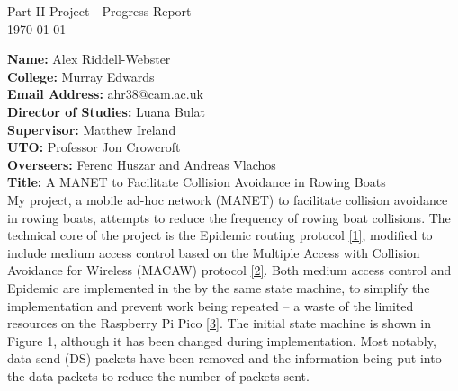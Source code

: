 \documentclass[10pt, a4paper]{article}
\begin{document}
\begin{center}
\Huge{Part II Project - Progress Report} \\
\Large{\today} \\
\end{center}
\textbf{Name:} Alex Riddell-Webster \\
\textbf{College:} Murray Edwards \\
\textbf{Email Address:} ahr38@cam.ac.uk \\
\textbf{Director of Studies:} Luana Bulat \\
\textbf{Supervisor:} Matthew Ireland \\
\textbf{UTO:} Professor Jon Crowcroft\\
\textbf{Overseers:}  Ferenc Huszar and Andreas Vlachos \\
\textbf{Title:} A MANET to Facilitate Collision Avoidance in Rowing Boats
\vspace{20px}\\
My project, a mobile ad-hoc network (MANET) to facilitate collision avoidance in rowing boats, attempts to reduce the frequency of rowing boat collisions. The technical core of the project is the Epidemic routing protocol \hyperref[epidemic]{[1]}, modified to include medium access control based on the Multiple Access with Collision Avoidance for Wireless (MACAW) protocol \hyperref[macaw]{[2]}. Both medium access control and Epidemic are implemented in the by the same state machine, to simplify the implementation and prevent work being repeated -- a waste of the limited resources on the Raspberry Pi Pico \hyperref[pico]{[3]}. The initial state machine is shown in Figure 1, although it has been changed during implementation. Most notably, data send (DS) packets have been removed and the information being put into the data packets to reduce the number of packets sent. \\
\end{document}

